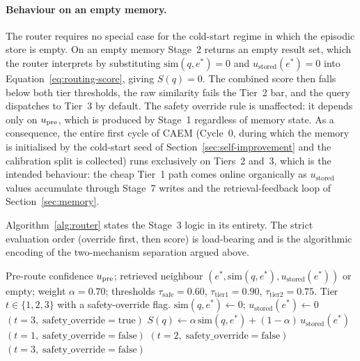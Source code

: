 \paragraph{Behaviour on an empty memory.}
The router requires no special case for the cold-start regime in which the episodic store is empty. On an empty memory Stage~2 returns an empty result set, which the router interprets by substituting $\mathrm{sim}(q, e^{*}) = 0$ and $u_{\text{stored}}(e^{*}) = 0$ into Equation~\ref{eq:routing-score}, giving $S(q) = 0$. The combined score then falls below both tier thresholds, the raw similarity fails the Tier~2 bar, and the query dispatches to Tier~3 by default. The safety override rule is unaffected: it depends only on $u_{\text{pre}}$, which is produced by Stage~1 regardless of memory state. As a consequence, the entire first cycle of CAEM (Cycle~0, during which the memory is initialised by the cold-start seed of Section~\ref{sec:self-improvement} and the calibration split is collected) runs exclusively on Tiers~2 and~3, which is the intended behaviour: the cheap Tier~1 path comes online organically as $u_{\text{stored}}$ values accumulate through Stage~7 writes and the retrieval-feedback loop of Section~\ref{sec:memory}.

Algorithm~\ref{alg:router} states the Stage~3 logic in its entirety. The strict evaluation order (override first, then score) is load-bearing and is the algorithmic encoding of the two-mechanism separation argued above.

\begin{algorithm}
\caption{Stage~3 three-tier routing decision.}
\label{alg:router}
\begin{algorithmic}[1]
\Require Pre-route confidence $u_{\text{pre}}$; retrieved neighbour $(e^{*}, \mathrm{sim}(q, e^{*}), u_{\text{stored}}(e^{*}))$ or empty; weight $\alpha = 0.70$; thresholds $\tau_{\text{safe}} = 0.60$, $\tau_{\text{tier1}} = 0.90$, $\tau_{\text{tier2}} = 0.75$.
\Ensure Tier $t \in \{1, 2, 3\}$ with a safety-override flag.
    \State $\mathrm{sim}(q, e^{*}) \gets 0$; $u_{\text{stored}}(e^{*}) \gets 0$ 
\EndIf
{}
    \State \Return $(t = 3, \; \text{safety\_override} = \text{true})$ 
\EndIf
\State $S(q) \gets \alpha\,\mathrm{sim}(q, e^{*}) + (1 - \alpha)\,u_{\text{stored}}(e^{*})$ 
    \State \Return $(t = 1, \; \text{safety\_override} = \text{false})$
    \State \Return $(t = 2, \; \text{safety\_override} = \text{false})$
\Else
    \State \Return $(t = 3, \; \text{safety\_override} = \text{false})$
\EndIf
\end{algorithmic}
\end{algorithm}


